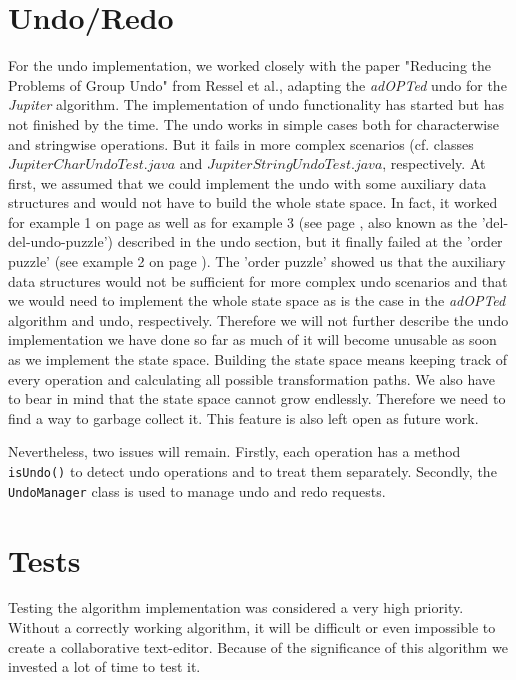 \section{Undo/Redo}
\label{undo_redo}
For the undo implementation, we worked closely with the paper "Reducing the Problems of Group Undo" from Ressel et al., adapting the \emph{adOPTed} undo for the \emph{Jupiter} algorithm. The implementation of undo functionality has started but has not finished by the time. The undo works in simple cases both for characterwise and stringwise operations. But it fails in more complex scenarios (cf. classes $JupiterCharUndoTest.java$ and $JupiterStringUndoTest.java$, respectively. At first, we assumed that we could implement the undo with some auxiliary data structures and would not have to build the whole state space. In fact, it worked for example 1 on page \pageref{example1} as well as for example 3 (see page \pageref{example3}, also known as the 'del-del-undo-puzzle') described in the undo section, but it finally failed at the 'order puzzle' (see example 2 on page \pageref{example2}). The 'order puzzle' showed us that the auxiliary data structures would not be sufficient for more complex undo scenarios and that we would need to implement the whole state space as is the case in the \emph{adOPTed} algorithm and undo, respectively. Therefore we will not further describe the undo implementation we have done so far as much of it will become unusable as soon as we implement the state space. Building the state space means keeping track of every operation and calculating all possible transformation paths. We also have to bear in mind that the state space cannot grow endlessly. Therefore we need to find a way to garbage collect it. This feature is also left open as future work.

Nevertheless, two issues will remain. Firstly, each operation has a method \texttt{isUndo()} to detect undo operations and to treat them separately. Secondly, the \texttt{UndoManager} class is used to manage undo and redo requests.

\section{Tests}
Testing the algorithm implementation was considered a very high priority. Without a correctly working algorithm, it will be difficult or even impossible to create a collaborative text-editor. Because of the significance of this algorithm we invested a lot of time to test it.

